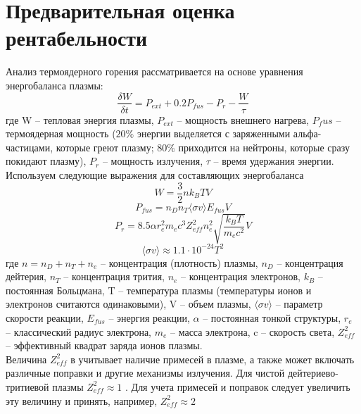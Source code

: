 \documentclass[a4paper,11pt]{article}
\begin{document}
\section{Предварительная оценка рентабельности} 
\indent Анализ термоядерного горения рассматривается на основе уравнения
энергобаланса плазмы:
\begin{equation}
	\frac{\delta W}{\delta t} = P_{ext} + 0.2P_{fus} - P_r - \frac{W}{\tau}
\end{equation}
где W – тепловая энергия плазмы, $P_{ext}$ – мощность внешнего нагрева, $P_fus$ – термоядерная
мощность ($20\% $ энергии выделяется с заряженными альфа-частицами, которые греют
плазму; $80\%$ приходится на нейтроны, которые сразу покидают плазму), $P_r$ – мощность
излучения, $\tau$ – время удержания энергии.\\
\indent Используем следующие выражения для составляющих энергобаланса
\begin{equation}
	W = \frac{3}{2}nk_BTV
\end{equation}
\begin{equation}
	P_{fus} = n_Dn_T\langle\sigma v\rangle E_{fus}V
\end{equation}
\begin{equation}
	P_r = 8.5\alpha r_e^2 m_ec^3Z_{eff}^2n_e^2\sqrt{\frac{k_BT}{m_ec^2}}V
\end{equation}
\begin{equation}
	\langle\sigma v\rangle \approx 1.1 \cdot 10^{-24} T^2
\end{equation}
где $n = n_D + n_T + n_e$ – концентрация (плотность) плазмы, $n_D$ – концентрация дейтерия, $n_T$ –
концентрация трития, $n_e$ – концентрация электронов, $k_B$ – постоянная Больцмана, T – 
температура плазмы (температуры ионов и электронов считаются одинаковыми), V – 
объем плазмы, $\langle \sigma v \rangle$ – параметр скорости реакции, $E_{fus}$ – энергия реакции, $\alpha$ – постоянная
тонкой структуры, $r_e$ – классический радиус электрона, $m_e$ – масса электрона, c – скорость
света, $Z_{eff}^2$ – эффективный квадрат заряда ионов плазмы. \\
\indent Величина $Z_{eff}^2$ в  учитывает наличие примесей в плазме, а также может включать
различные поправки и другие механизмы излучения. Для чистой дейтериево-тритиевой
плазмы $Z_{eff}^2 \approx 1$ . Для учета примесей и поправок следует увеличить эту величину и
принять, например, $Z_{eff}^2 \approx 2$ 

\end{document}
